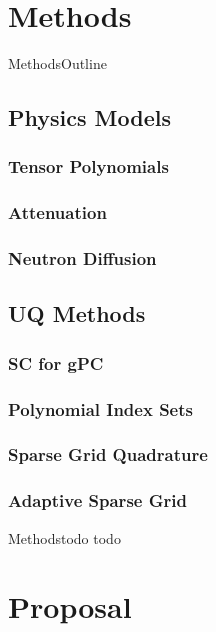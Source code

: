 \documentclass{beamer}
\begin{document}
\section{Methods}
\begin{frame}{Methods}{Outline}\vspace{-20pt}
  \tableofcontents[currentsection]
\end{frame}
\subsection{Physics Models}
\subsubsection{Tensor Polynomials}
\subsubsection{Attenuation}
\subsubsection{Neutron Diffusion}

\subsection{UQ Methods}
\subsubsection{SC for gPC}
\subsubsection{Polynomial Index Sets}
\subsubsection{Sparse Grid Quadrature}
\subsubsection{Adaptive Sparse Grid}

\begin{frame}{Methods}{todo}
  todo
\end{frame}

\section{Proposal}
\end{document}
